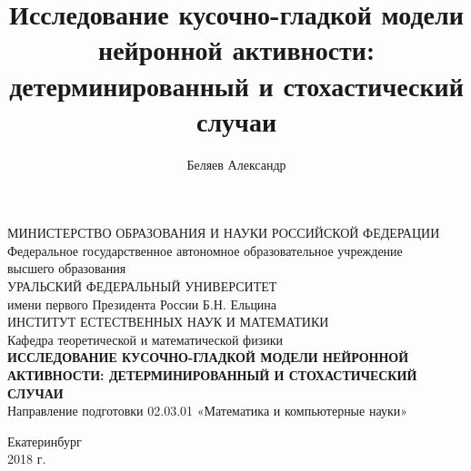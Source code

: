 \documentclass[a4paper, 14pt]{extreport}
\title{Исследование кусочно-гладкой модели нейронной активности: детерминированный и стохастический случаи}
\author{Беляев Александр}
\numberwithin{equation}{section}
\numberwithin{figure}{section}
\numberwithin{table}{section}
\newcommand{\empline}{\mbox{}\newline}
\newcommand{\likechapterheading}[1]{
    \begin{center}
    \textbf{\MakeUppercase{#1}}
    \end{center}
    \empline}
\newcommand{\likechapter}[1]{
    \likechapterheading{#1}
    \addcontentsline{toc}{likechapter}{\MakeUppercase{#1}}}
\begin{document}
\def\contentsname{\likechapterheading{СОДЕРЖАНИЕ}} %
\def\bibname{\likechapter{Список использованных источников}}
\begin{titlepage}
\begin{center}
\large
\hspace{-15mm}МИНИСТЕРСТВО ОБРАЗОВАНИЯ И НАУКИ РОССИЙСКОЙ ФЕДЕРАЦИИ\\
Федеральное государственное автономное образовательное учреждение\\
высшего образования\\
УРАЛЬСКИЙ ФЕДЕРАЛЬНЫЙ УНИВЕРСИТЕТ\\
имени первого Президента России Б.Н. Ельцина\\
\vspace{8mm}
ИНСТИТУТ ЕСТЕСТВЕННЫХ НАУК И МАТЕМАТИКИ\\
\vspace{15mm}
Кафедра теоретической и математической физики\\%
\vspace{12mm}
\textbf{ИССЛЕДОВАНИЕ КУСОЧНО-ГЛАДКОЙ МОДЕЛИ НЕЙРОННОЙ АКТИВНОСТИ: ДЕТЕРМИНИРОВАННЫЙ И СТОХАСТИЧЕСКИЙ СЛУЧАИ} \\
\vspace{7mm}
Направление подготовки 02.03.01 «Математика и компьютерные науки»
\end{center}
\vspace{20mm}

\vfill
\begin{center}
 Екатеринбург\\2018 г.
\end{center}
\end{titlepage}


\setcounter{page}{2}

\newpage


\end{document}
